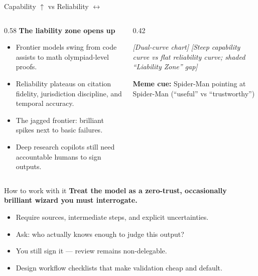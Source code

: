 \documentclass[10pt, aspectratio=169]{beamer}
\newcommand{\placeholder}[1]{\textit{[#1]}}
\newcommand{\memecue}[1]{\textcolor{aauDarkBlue}{\textbf{Meme cue:} #1}}
\begin{document}
\begin{frame}{Capability \(\uparrow\) vs Reliability \(\leftrightarrow\)}
  \begin{columns}[T]
    \begin{column}{0.58\textwidth}
      \textbf{The liability zone opens up}
      \begin{itemize}
        \item Frontier models swing from code assists to math olympiad-level proofs.
        \item Reliability plateaus on citation fidelity, jurisdiction discipline, and temporal accuracy.
        \item The jagged frontier: brilliant spikes next to basic failures.
        \item Deep research copilots still need accountable humans to sign outputs.
      \end{itemize}
    \end{column}
    \begin{column}{0.42\textwidth}
      \begin{block}{\placeholder{Dual-curve chart}}
        \centering
        \placeholder{Steep capability curve vs flat reliability curve; shaded ``Liability Zone'' gap}
      \end{block}
      \memecue{Spider-Man pointing at Spider-Man (``useful'' vs ``trustworthy'')}
    \end{column}
  \end{columns}
  \vfill
  \small \parencite{gemini_longcontext,claude35_sonnet,gpt41_openai,openai_deep_research,jagged_frontier}
\end{frame}

\begin{frame}{How to work with it}
  \textbf{Treat the model as a zero-trust, occasionally brilliant wizard you must interrogate.}
  \vspace{1em}
  \begin{itemize}
    \item Require sources, intermediate steps, and explicit uncertainties.
    \item Ask: who actually knows enough to judge this output?
    \item You still sign it --- review remains non-delegable.
    \item Design workflow checklists that make validation cheap and default.
  \end{itemize}
  \vfill
  \small \parencite{hai_hallucination,mollick_wizards}
\end{frame}
\end{document}

